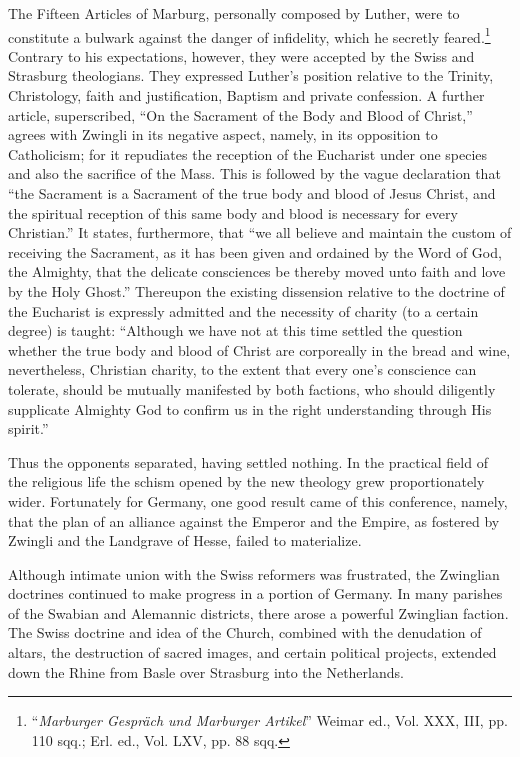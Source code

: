 The Fifteen Articles of Marburg, personally composed by Luther, were to
constitute a bulwark against the danger of infidelity, which he secretly
feared.\footnote{“\textit{Marburger Gespräch und Marburger Artikel}” Weimar ed., Vol. XXX, III, pp. 110
sqq.; Erl. ed., Vol. LXV, pp. 88 sqq.}
Contrary to his expectations, however, they were accepted by the
Swiss and Strasburg theologians. They expressed Luther’s position relative
to the Trinity, Christology, faith and justification, Baptism and private confession.
A further article, superscribed, “On the Sacrament of the Body and
Blood of Christ,” agrees with Zwingli in its negative aspect, namely, in its
opposition to Catholicism; for it repudiates the reception of the Eucharist
under one species and also the sacrifice of the Mass. This is followed by the
vague declaration that “the Sacrament is a Sacrament of the true body and
blood of Jesus Christ, and the spiritual reception of this same body and blood
is necessary for every Christian.” It states, furthermore, that “we all believe
and maintain the custom of receiving the Sacrament, as it has been given and
ordained by the Word of God, the Almighty, that the delicate consciences
be thereby moved unto faith and love by the Holy Ghost.” Thereupon the
existing dissension relative to the doctrine of the Eucharist is expressly
admitted and the necessity of charity (to a certain degree) is taught:
“Although we have not at this time settled the question whether the true body
and blood of Christ are corporeally in the bread and wine, nevertheless,
Christian charity, to the extent that every one’s conscience can tolerate,
should be mutually manifested by both factions, who should diligently
supplicate Almighty God to confirm us in the right understanding through His
spirit.”

Thus the opponents separated, having settled nothing. In the practical
field of the religious life the schism opened by the new theology
grew proportionately wider. Fortunately for Germany, one good
result came of this conference, namely, that the plan of an alliance
against the Emperor and the Empire, as fostered by Zwingli and the
Landgrave of Hesse, failed to materialize.

Although intimate union with the Swiss reformers was frustrated,
the Zwinglian doctrines continued to make progress in a portion
of Germany. In many parishes of the Swabian and Alemannic districts,
there arose a powerful Zwinglian faction. The Swiss doctrine and idea
of the Church, combined with the denudation of altars, the destruction
of sacred images, and certain political projects,
extended down the Rhine from Basle over Strasburg into the Netherlands.

